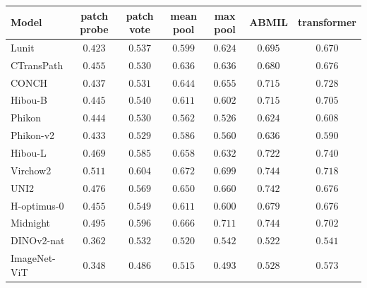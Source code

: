\begin{tabular}{lcccccc}
\toprule
Model & patch probe & patch vote & mean pool & max pool & ABMIL & transformer \\
\midrule
Lunit & $0.423$ & $0.537$ & $0.599$ & $0.624$ & $0.695$ & $0.670$ \\
CTransPath & $0.455$ & $0.530$ & $0.636$ & $0.636$ & $0.680$ & $0.676$ \\
CONCH & $0.437$ & $0.531$ & $0.644$ & $0.655$ & $0.715$ & $0.728$ \\
Hibou-B & $0.445$ & $0.540$ & $0.611$ & $0.602$ & $0.715$ & $0.705$ \\
Phikon & $0.444$ & $0.530$ & $0.562$ & $0.526$ & $0.624$ & $0.608$ \\
Phikon-v2 & $0.433$ & $0.529$ & $0.586$ & $0.560$ & $0.636$ & $0.590$ \\
Hibou-L & $0.469$ & $0.585$ & $0.658$ & $0.632$ & $0.722$ & $0.740$ \\
Virchow2 & $0.511$ & $0.604$ & $0.672$ & $0.699$ & $0.744$ & $0.718$ \\
UNI2 & $0.476$ & $0.569$ & $0.650$ & $0.660$ & $0.742$ & $0.676$ \\
H-optimus-0 & $0.455$ & $0.549$ & $0.611$ & $0.600$ & $0.679$ & $0.676$ \\
Midnight & $0.495$ & $0.596$ & $0.666$ & $0.711$ & $0.744$ & $0.702$ \\
\midrule
DINOv2-nat & $0.362$ & $0.532$ & $0.520$ & $0.542$ & $0.522$ & $0.541$ \\
ImageNet-ViT & $0.348$ & $0.486$ & $0.515$ & $0.493$ & $0.528$ & $0.573$ \\
\bottomrule
\end{tabular}
